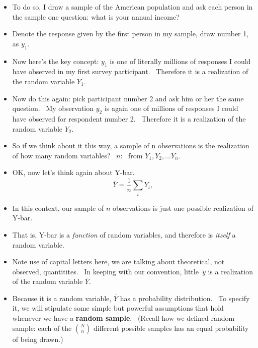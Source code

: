 \documentclass[11pt]{article}
\begin{document}
\begin{itemize}
\begin{itemize}
\item To do so, I draw a sample of the American population and ask each
person in the sample one question: what is your annual income?

\item Denote the response given by the first person in my sample, draw
number 1, as $y_{1}.$ \ 

\item Now here's the key concept: $y_{1}$ is one of literally millions of
responses I could have observed in my first survey participant. \ Therefore
it is a realization of the random variable $Y_{1}.$

\item Now do this again: pick participant number 2 and ask him or her the
same question. \ My observation $y_{2}$ is again one of millions of
responses I could have observed for respondent number 2. \ Therefore it is a
realization of the random variable $Y_{2}$.

\item So if we think about it this way, a sample of n observations is the
realization of how many random variables? \ $n$: \ from $%
Y_{1},Y_{2},...Y_{n}.$

\item OK, now let's think again about Y-bar. \ 
\begin{equation*}
\overline{Y}=\frac{1}{n}\sum_{i}Y_{i},
\end{equation*}

\item In this context, our sample of $n$ observations is just one possible
realization of Y-bar.

\item That is, Y-bar is a \textit{function }of random variables, and
therefore is \textit{itself }a random variable. \ \ 

\item Note use of capital letters here, we are talking about theoretical,
not observed, quantitites. \ In keeping with our convention, little\ $\bar{y}
$ is a realization of the random variable $\overline{Y}.$ \ 

\item Because it is a random variable, $\overline{Y}$ has a probability
distribution. \ To specify it, we will stipulate some simple but powerful
assumptions that hold whenever we have a \textbf{random sample}. \ (Recall
how we defined random sample: each of the $\binom{N}{n}$ different possible
samples has an equal probability of being drawn.) \ 
\end{itemize}


\end{itemize}
\end{document}
